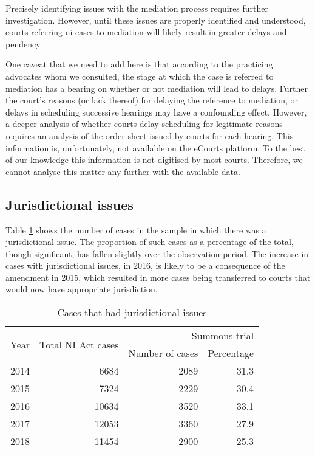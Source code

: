 Precisely identifying issues with the mediation process requires further investigation. However, until these issues are properly identified and understood, courts referring \gls{ni} cases to mediation will likely result in greater delays and pendency.

One caveat that we need to add here is that according to the practicing advocates whom we consulted, the stage at which the case is referred to mediation has a bearing on whether or not mediation will lead to delays. Further the court's reasons (or lack thereof) for delaying the reference to mediation, or delays in scheduling successive hearings may have a confounding effect. However, a deeper analysis of whether courts delay scheduling for legitimate reasons requires an analysis of the order sheet issued by courts for each hearing. This information is, unfortunately, not available on the eCourts platform. To the best of our knowledge this information is not digitised by most courts. Therefore, we cannot analyse this matter any further with the available data.

\subsection{Jurisdictional issues}
\label{sec:jurisd-issu}

Table \ref{tab:jurisdiction_yearWise} shows the number of cases in the sample in which there was a jurisdictional issue. The proportion of such cases as a percentage of the total, though significant, has fallen slightly over the observation period. The increase in cases with jurisdictional issues, in 2016, is likely to be a consequence of the amendment in 2015, which resulted in more cases being transferred to courts that would now have appropriate jurisdiction.

\begin{longtable}[h!]{@{}lrrr@{}}
  \caption{Cases that had jurisdictional issues}\label{tab:jurisdiction_yearWise}\\
\toprule
\multirow{2}{*}{Year} &  \multirow{2}{*}{Total NI Act cases} & \multicolumn{2}{p{4cm}}{Summons trial}\\
\cmidrule{3-4}
&& Number of cases & Percentage \\
\midrule\endhead
2014 &   6684 &  2089 &  31.3 \\
2015 &   7324 &  2229 &  30.4 \\
2016 &  10634 &  3520 &  33.1 \\
2017 &  12053 &  3360 &  27.9 \\
2018 &  11454 &  2900 &  25.3 \\
\bottomrule
\end{longtable}

